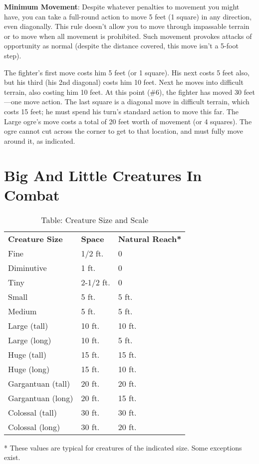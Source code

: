 \textbf{Minimum Movement}: Despite whatever penalties to movement you might have, you can take a full-round action to move 5 feet (1 square) in any direction, even diagonally. This rule doesn't allow you to move through impassable terrain or to move when all movement is prohibited. Such movement provokes attacks of opportunity as normal (despite the distance covered, this move isn't a 5-foot step).

The fighter's first move costs him 5 feet (or 1 square). His next costs 5 feet also, but his third (his 2nd diagonal) costs him 10 feet. Next he moves into difficult terrain, also costing him 10 feet. At this point (\#6), the fighter has moved 30 feet---one move action. The last square is a diagonal move in difficult terrain, which costs 15 feet; he must spend his turn's standard action to move this far.\newline
The Large ogre's move costs a total of 20 feet worth of movement (or 4 squares). The ogre cannot cut across the corner to get to that location, and must fully move around it, as indicated.



\section{Big And Little Creatures In Combat}
\begin{table}[]
\sffamily
\caption{Table: Creature Size and Scale}
\begin{tabular}{lll}
\textbf{Creature Size} & \textbf{Space} & \textbf{Natural Reach*}\\
Fine & 1/2 ft. & 0 \\
 Diminutive & 1 ft. & 0 \\
 Tiny & 2-1/2 ft. & 0 \\
 Small & 5 ft. & 5 ft. \\
 Medium & 5 ft. & 5 ft. \\
 Large (tall) & 10 ft. & 10 ft. \\
 Large (long) & 10 ft. & 5 ft. \\
 Huge (tall) & 15 ft. & 15 ft. \\
 Huge (long) & 15 ft. & 10 ft. \\
 Gargantuan (tall) & 20 ft. & 20 ft. \\
 Gargantuan (long) & 20 ft. & 15 ft. \\
 Colossal (tall) & 30 ft. & 30 ft. \\
 Colossal (long) & 30 ft. & 20 ft.\\
\end{tabular}
* These values are typical for creatures of the indicated size. Some exceptions exist.\\
\end{table}
				

